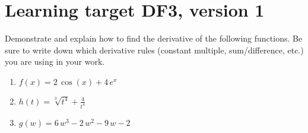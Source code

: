 \section{Learning target DF3, version 1}
\providecommand{\stxKnowl}{}\renewcommand{\stxKnowl}[1]{#1}
\providecommand{\stxOuttro}{}\renewcommand{\stxOuttro}[1]{#1}
\providecommand{\stxTitle}{}\renewcommand{\stxTitle}[1]{#1}
\renewcommand{\stxOuttro}[1]{}
\stxKnowl{
 Demonstrate and explain how to find the derivative of the following functions. Be sure to write down which derivative rules (constant multiple, sum/difference, etc.) you are using in your work.

\begin{enumerate}
\item
\stxKnowl{
 \(f(x) = 2 \, \cos\left(x\right) + 4 \, e^{x}\) 

\stxOuttro{
 \[f'(x) = 4 \, e^{x} - 2 \, \sin\left(x\right)\] 

}
}
\vfill 
\item
\stxKnowl{
 \(h(t) = \sqrt[3]{t^4} + \frac{4}{t^{4}}\)

\stxOuttro{
 \[h'(t) = \frac{4}{3} \, t^{\frac{1}{3}} - \frac{16}{t^{5}}\] 

}
}
\vfill 
\item
\stxKnowl{
 \(g(w) = 6 \, w^{3} - 2 \, w^{2} - 9 \, w - 2\)

\stxOuttro{
 \[g'(w) = 18 \, w^{2} - 4 \, w - 9\] 

}
}
\vfill 
\end{enumerate}
}

\pagebreak

